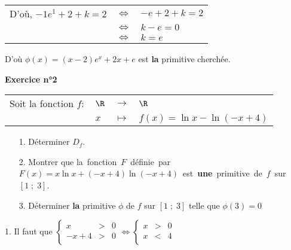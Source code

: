\begin{tabular}{lll}
\hspace{-.3cm} D'où, $-1e^1 + 2 + k = 2$ & $\Longleftrightarrow$ & $-e + 2 + k = 2$ \\
& $\Longleftrightarrow$ & $k - e = 0$ \\
& $\Longleftrightarrow$ & $k = e$ \\
\end{tabular}

D'où $\phi\left(x\right) = \left(x-2\right)e^x + 2x + e$ est \textbf{la} primitive cherchée. \\

\newpage

\textbf{Exercice n°2} \\

\begin{tabular}{llll}
\hspace{-.3cm} Soit la fonction $f:$ & $\R$ & $\longrightarrow$ & $\R$ \\
& $x$ & $\longmapsto$ & $f(x) = \ln x - \ln\left(-x + 4\right)$ \\
\end{tabular}

\vspace*{.3cm}

\begin{itemize}
\item[1.] Déterminer $D_f$. \\
\item[2.] Montrer que \hbox{la fonction $F$ définie par $F(x) = x\ln x + \left(-x + 4\right)\ln\left(-x + 4\right)$ est \textbf{une} primitive de $f$ sur $\left[1 \; ; \; 3\right]$.} \\
\item[3.] Déterminer \textbf{la} primitive $\phi$ de $f$ sur $\left[1 \; ; \; 3\right]$ telle que $\phi\left(3\right) = 0$ \\
\end{itemize}

\vspace*{.3cm}

1. Il faut que $\left\{
  \begin{array}{rll}
    x & > & 0 \\
    -x+4 & > & 0 \\
  \end{array}
\right. \Longleftrightarrow \left\{
  \begin{array}{rll}
    x & > & 0 \\
    x & < & 4 \\
  \end{array}
\right.$ \vspace*{.3cm} \\

